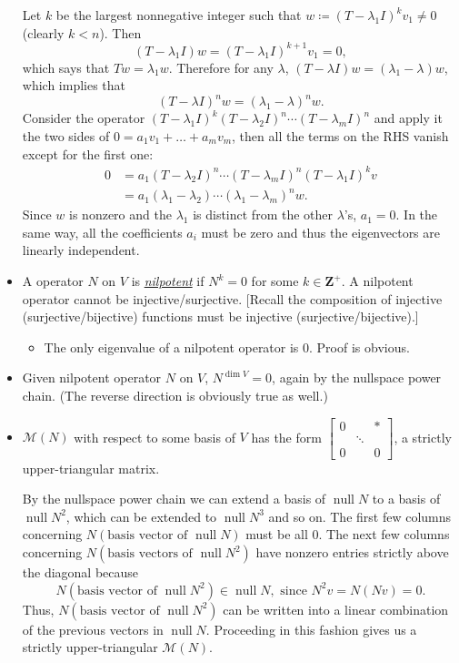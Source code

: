 \documentclass{article}
\newcommand{\df}[1]{\ul{\textit{#1}}}
\newcommand{\Z}{\mathbf{Z}}
\newcommand{\n}{\operatorname{null}}
\renewcommand{\d}{\dim}
\newcommand{\M}{\mathcal{M}}
\begin{document}
\begin{itemize}
    Let $k$ be the largest nonnegative integer such that $w \coloneqq (T-\lambda_1 I)^k v_1 \not= 0$ (clearly $k < n$). Then $$(T - \lambda_1 I)w = (T - \lambda_1 I)^{k+1} v_1 = 0,$$ which says that $Tw = \lambda_1 w$. Therefore for any $\lambda$, $(T-\lambda I) w = (\lambda_1 - \lambda) w$, which implies that $$(T-\lambda I)^n w = (\lambda_1 - \lambda)^n w.$$ Consider the operator $(T-\lambda_1 I)^k (T-\lambda_2 I)^n \cdots (T-\lambda_m I)^n$ and apply it the two sides of $0 = a_1v_1 + \dots + a_mv_m$, then all the terms on the RHS vanish except for the first one:
    \begin{align*}
    0 & = a_1 (T-\lambda_2 I)^n \cdots (T-\lambda_m I)^n (T-\lambda_1 I)^k v \\ & = a_1 (\lambda_1 -\lambda_2) \cdots (\lambda_1 - \lambda_m)^n w.
    \end{align*}
    Since $w$ is nonzero and the $\lambda_1$ is distinct from the other $\lambda$'s, $a_1 = 0$. In the same way, all the coefficients $a_i$ must be zero and thus the eigenvectors are linearly independent.
	\item A operator $N$ on $V$ is \df{nilpotent} if $N^k = 0$ for some $k \in \Z^+$. A nilpotent operator cannot be injective/surjective. [Recall the composition of injective (surjective/bijective) functions must be injective (surjective/bijective).]
	\begin{itemize}
	\item The only eigenvalue of a nilpotent operator is 0. Proof is obvious.
	\end{itemize}
	\item Given nilpotent operator $N$ on $V$, $N^{\d V} = 0$, again by the nullspace power chain. (The reverse direction is obviously true as well.)
	\item $\M(N)$ with respect to some basis of $V$ has the form $	\begin{bmatrix}
		0 & & \ast \\
		 & \ddots & \\
		 0 & & 0
	\end{bmatrix}$,
    a strictly upper-triangular matrix.
	
    By the nullspace power chain we can extend a basis of $\n N$ to a basis of $\n N^2$, which can be extended to $\n N^3$ and so on.
    The first few columns concerning $N(\text{basis vector of } \n N)$ must be all 0. The next few columns concerning $N(\text{basis vectors of } \n N^2)$ have nonzero entries strictly above the diagonal because $$N(\text{basis vector of } \n N^2) \in \n N, \text{ since }N^2v = N(Nv) = 0.$$ Thus, $N(\text{basis vector of } \n N^2)$ can be written into a linear combination of the previous vectors in $\n N$. Proceeding in this fashion gives us a strictly upper-triangular $\M(N)$.
\end{itemize}
\end{document}
